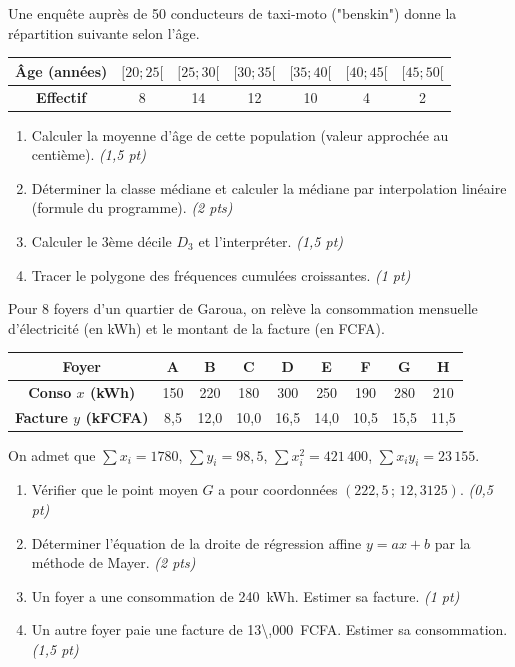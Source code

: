 \documentclass[11pt]{article}
\begin{document}
\begin{exercice}
Une enquête auprès de 50 conducteurs de taxi-moto ("benskin") donne la répartition suivante selon l'âge.
\begin{center}
\begin{tabular}{|c|c|c|c|c|c|c|}
\hline
\textbf{Âge (années)} & $[20;25[$ & $[25;30[$ & $[30;35[$ & $[35;40[$ & $[40;45[$ & $[45;50[$ \\ \hline
\textbf{Effectif} & 8 & 14 & 12 & 10 & 4 & 2 \\ \hline
\end{tabular}
\end{center}
\begin{enumerate}
    \item Calculer la moyenne d'âge de cette population (valeur approchée au centième). \textit{(1,5 pt)}
    \item Déterminer la classe médiane et calculer la médiane par interpolation linéaire (formule du programme). \textit{(2 pts)}
    \item Calculer le 3ème décile $D_3$ et l'interpréter. \textit{(1,5 pt)}
    \item Tracer le polygone des fréquences cumulées croissantes. \textit{(1 pt)}
\end{enumerate}
\end{exercice}

\begin{exercice}
Pour 8 foyers d'un quartier de Garoua, on relève la consommation mensuelle d'électricité (en kWh) et le montant de la facture (en FCFA).
\begin{center}
\begin{tabular}{|c|c|c|c|c|c|c|c|c|}
\hline
\textbf{Foyer} & A & B & C & D & E & F & G & H \\ \hline
\textbf{Conso $x$ (kWh)} & 150 & 220 & 180 & 300 & 250 & 190 & 280 & 210 \\ \hline
\textbf{Facture $y$ (kFCFA)} & 8,5 & 12,0 & 10,0 & 16,5 & 14,0 & 10,5 & 15,5 & 11,5 \\ \hline
\end{tabular}
\end{center}
On admet que $\sum x_i = 1780$, $\sum y_i = 98,5$, $\sum x_i^2 = 421\,400$, $\sum x_i y_i = 23\,155$.
\begin{enumerate}
    \item Vérifier que le point moyen $G$ a pour coordonnées $(222,5\,;\,12,3125)$. \textit{(0,5 pt)}
    \item Déterminer l'équation de la droite de régression affine $y = ax + b$ par la méthode de Mayer. \textit{(2 pts)}
    \item Un foyer a une consommation de \SI{240}{kWh}. Estimer sa facture. \textit{(1 pt)}
    \item Un autre foyer paie une facture de \SI{13\,000}{FCFA}. Estimer sa consommation. \textit{(1,5 pt)}
\end{enumerate}
\end{exercice}
\end{document}
